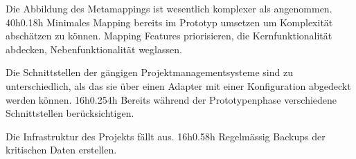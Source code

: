 		{Die Abbildung des Metamappings ist wesentlich komplexer als angenommen.}
		{40h}{0.1}{8h}
		{Minimales Mapping bereits im Prototyp umsetzen um Komplexität abschätzen zu können. Mapping Features priorisieren, die Kernfunktionalität abdecken, Nebenfunktionalität weglassen.}

		{Die Schnittstellen der gängigen Projektmanagementsysteme sind zu unterschiedlich, als das sie über einen Adapter mit einer Konfiguration abgedeckt werden können.}
		{16h}{0.25}{4h}
		{Bereits während der Prototypenphase verschiedene Schnittstellen berücksichtigen.}

		{Die Infrastruktur des Projekts fällt aus.}
		{16h}{0.5}{8h}
		{Regelmässig Backups der kritischen Daten erstellen.}
